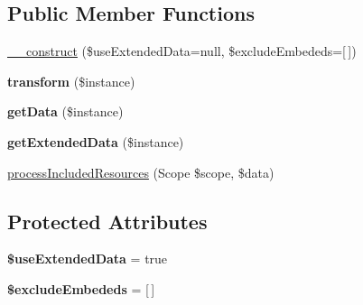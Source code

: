 \subsection*{Public Member Functions}
\begin{DoxyCompactItemize}
\item 
\hyperlink{classDMA_1_1Friends_1_1Classes_1_1API_1_1BaseTransformer_a7a7324551796970ba6285f8aaef675b7}{\+\_\+\+\_\+construct} (\$use\+Extended\+Data=null, \$exclude\+Embededs=\mbox{[}$\,$\mbox{]})
\item 
\hypertarget{classDMA_1_1Friends_1_1Classes_1_1API_1_1BaseTransformer_aafe7c10cfc1517b7892ec5656b7d713e}{}{\bfseries transform} (\$instance)\label{classDMA_1_1Friends_1_1Classes_1_1API_1_1BaseTransformer_aafe7c10cfc1517b7892ec5656b7d713e}

\item 
\hypertarget{classDMA_1_1Friends_1_1Classes_1_1API_1_1BaseTransformer_ab9ee38df16a958e807f656536d6a52ac}{}{\bfseries get\+Data} (\$instance)\label{classDMA_1_1Friends_1_1Classes_1_1API_1_1BaseTransformer_ab9ee38df16a958e807f656536d6a52ac}

\item 
\hypertarget{classDMA_1_1Friends_1_1Classes_1_1API_1_1BaseTransformer_a65405b67e5ba720a70a5447563df4ef9}{}{\bfseries get\+Extended\+Data} (\$instance)\label{classDMA_1_1Friends_1_1Classes_1_1API_1_1BaseTransformer_a65405b67e5ba720a70a5447563df4ef9}

\item 
\hyperlink{classDMA_1_1Friends_1_1Classes_1_1API_1_1BaseTransformer_ab219fbf7518a5a42d20583206ab454a7}{process\+Included\+Resources} (Scope \$scope, \$data)
\end{DoxyCompactItemize}
\subsection*{Protected Attributes}
\begin{DoxyCompactItemize}
\item 
\hypertarget{classDMA_1_1Friends_1_1Classes_1_1API_1_1BaseTransformer_a389965bafe633dc8548b16a2e303e895}{}{\bfseries \$use\+Extended\+Data} = true\label{classDMA_1_1Friends_1_1Classes_1_1API_1_1BaseTransformer_a389965bafe633dc8548b16a2e303e895}

\item 
\hypertarget{classDMA_1_1Friends_1_1Classes_1_1API_1_1BaseTransformer_a664c0f4bbb62bfb386c9e7b8d736e259}{}{\bfseries \$exclude\+Embededs} = \mbox{[}$\,$\mbox{]}\label{classDMA_1_1Friends_1_1Classes_1_1API_1_1BaseTransformer_a664c0f4bbb62bfb386c9e7b8d736e259}

\end{DoxyCompactItemize}


